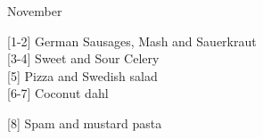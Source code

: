 		\begin{menu}{November}
    
    \begin{recipelist}
    
        {\scriptsize[1-2]} German Sausages, Mash and Sauerkraut\\
        {\scriptsize[3-4]} Sweet and Sour Celery\\
        {\scriptsize[5]} Pizza and Swedish salad\\
        {\scriptsize[6-7]} Coconut dahl\\%
    \end{recipelist}%
    \begin{recipelist}
    
        {\scriptsize[8]} Spam and mustard pasta\\
    \end{recipelist}\par%
  

\end{menu}
